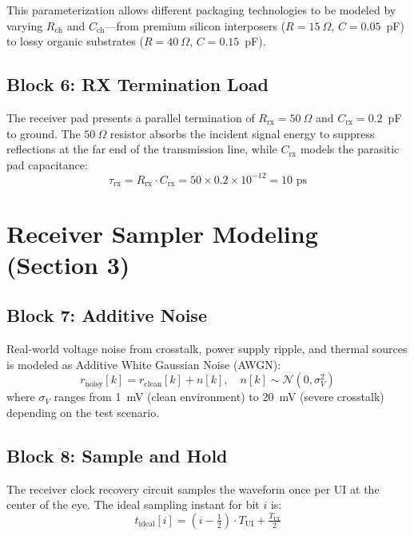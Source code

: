 \documentclass[conference]{IEEEtran}
\begin{document}
This parameterization allows different packaging technologies to be modeled by varying $R_{\text{ch}}$ and $C_{\text{ch}}$---from premium silicon interposers ($R=15~\Omega$, $C=0.05$~pF) to lossy organic substrates ($R=40~\Omega$, $C=0.15$~pF).

\subsection{Block 6: RX Termination Load}

The receiver pad presents a parallel termination of $R_{\text{rx}} = 50~\Omega$ and $C_{\text{rx}} = 0.2$~pF to ground. The $50~\Omega$ resistor absorbs the incident signal energy to suppress reflections at the far end of the transmission line, while $C_{\text{rx}}$ models the parasitic pad capacitance:
\begin{equation}
    \tau_{\text{rx}} = R_{\text{rx}} \cdot C_{\text{rx}} = 50 \times 0.2 \times 10^{-12} = 10 \text{ ps}
\end{equation}

\section{Receiver Sampler Modeling (Section 3)}

\subsection{Block 7: Additive Noise}

Real-world voltage noise from crosstalk, power supply ripple, and thermal sources is modeled as Additive White Gaussian Noise (AWGN):
\begin{equation}
    r_{\text{noisy}}[k] = r_{\text{clean}}[k] + n[k], \quad n[k] \sim \mathcal{N}(0, \sigma_V^2)
\end{equation}
where $\sigma_V$ ranges from 1~mV (clean environment) to 20~mV (severe crosstalk) depending on the test scenario.

\subsection{Block 8: Sample and Hold}

The receiver clock recovery circuit samples the waveform once per UI at the center of the eye. The ideal sampling instant for bit $i$ is:
\begin{equation}
    t_{\text{ideal}}[i] = \left(i - \tfrac{1}{2}\right) \cdot T_{\text{UI}} + \tfrac{T_{\text{UI}}}{2}
\end{equation}
\end{document}
